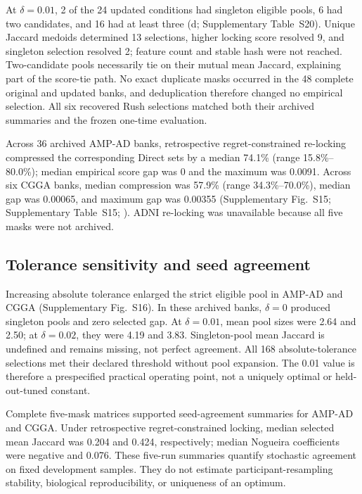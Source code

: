 At \(\delta=0.01\), 2 of the 24 updated conditions had singleton eligible pools, 6 had two candidates, and 16 had at least three (d; Supplementary Table~S20). Unique Jaccard medoids determined 13 selections, higher locking score resolved 9, and singleton selection resolved 2; feature count and stable hash were not reached. Two-candidate pools necessarily tie on their mutual mean Jaccard, explaining part of the score-tie path. No exact duplicate masks occurred in the 48 complete original and updated banks, and deduplication therefore changed no empirical selection. All six recovered Rush selections matched both their archived summaries and the frozen one-time evaluation.

Across 36 archived AMP-AD banks, retrospective regret-constrained re-locking compressed the corresponding Direct sets by a median 74.1\% (range 15.8\%--80.0\%); median empirical score gap was 0 and the maximum was 0.0091. Across six CGGA banks, median compression was 57.9\% (range 34.3\%--70.0\%), median gap was 0.00065, and maximum gap was 0.00355 (Supplementary Fig.~S15; Supplementary Table~S15; ). ADNI re-locking was unavailable because all five masks were not archived.



\subsection{Tolerance sensitivity and seed agreement}

Increasing absolute tolerance enlarged the strict eligible pool in AMP-AD and CGGA (Supplementary Fig.~S16). In these archived banks, \(\delta=0\) produced singleton pools and zero selected gap. At \(\delta=0.01\), mean pool sizes were 2.64 and 2.50; at \(\delta=0.02\), they were 4.19 and 3.83. Singleton-pool mean Jaccard is undefined and remains missing, not perfect agreement. All 168 absolute-tolerance selections met their declared threshold without pool expansion. The 0.01 value is therefore a prespecified practical operating point, not a uniquely optimal or held-out-tuned constant.

Complete five-mask matrices supported seed-agreement summaries for AMP-AD and CGGA. Under retrospective regret-constrained locking, median selected mean Jaccard was 0.204 and 0.424, respectively; median Nogueira coefficients were negative and 0.076. These five-run summaries quantify stochastic agreement on fixed development samples. They do not estimate participant-resampling stability, biological reproducibility, or uniqueness of an optimum.

